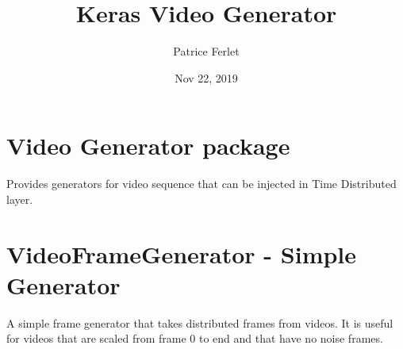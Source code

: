 \documentclass[letterpaper,10pt,english]{sphinxmanual}
\title{Keras Video Generator}
\date{Nov 22, 2019}
\author{Patrice Ferlet}
\begin{document}
\pagestyle{empty}
\sphinxmaketitle
\pagestyle{plain}
\sphinxtableofcontents
\pagestyle{normal}
\label{\detokenize{index::doc}}


\chapter{Video Generator package}
\label{\detokenize{index:video-generator-package}}
Provides generators for video sequence that can be injected in Time Distributed layer.
\label{\detokenize{index:module-keras_video.generator}}

\chapter{VideoFrameGenerator - Simple Generator}
\label{\detokenize{index:videoframegenerator-simple-generator}}
A simple frame generator that takes distributed frames from
videos. It is useful for videos that are scaled from frame 0 to end
and that have no noise frames.
\end{document}
